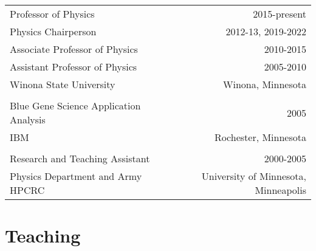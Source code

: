 \documentclass[margin,line,letterpaper]{res}
\begin{document}
\begin{resume}
\begin{table}[h]
\begin{center}
\begin{tabular}{lr}
Professor of Physics&2015-present\\
Physics Chairperson &2012-13, 2019-2022\\
Associate Professor of Physics&2010-2015\\
Assistant Professor of Physics&2005-2010\\
Winona State University&Winona, Minnesota\\
\\
Blue Gene Science Application Analysis &  2005\\
IBM & Rochester, Minnesota\\
\\
Research and Teaching Assistant & 2000-2005\\
Physics Department  and Army HPCRC & University of Minnesota, Minneapolis\\
\end{tabular}
\end{center}
\end{table}

\section{\bf Teaching}


\end{resume}
\end{document}
